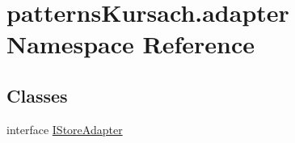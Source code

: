 \hypertarget{namespacepatterns_kursach_1_1adapter}{}\section{patterns\+Kursach.\+adapter Namespace Reference}
\label{namespacepatterns_kursach_1_1adapter}
\subsection*{Classes}
\begin{DoxyCompactItemize}
\item 
interface \mbox{\hyperlink{interfacepatterns_kursach_1_1adapter_1_1_i_store_adapter}{I\+Store\+Adapter}}
\end{DoxyCompactItemize}
